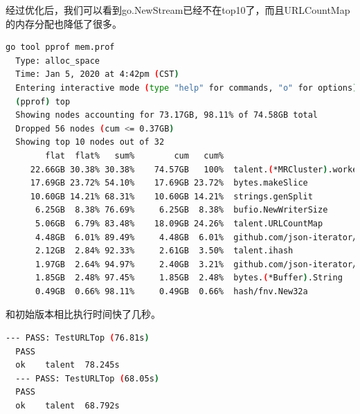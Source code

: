 \documentclass[UTF8]{ctexart}
\begin{document}
经过优化后，我们可以看到go.NewStream已经不在top10了，而且URLCountMap的内存分配也降低了很多。
\begin{lstlisting}[language=bash]
  go tool pprof mem.prof
  Type: alloc_space
  Time: Jan 5, 2020 at 4:42pm (CST)
  Entering interactive mode (type "help" for commands, "o" for options)
  (pprof) top
  Showing nodes accounting for 73.17GB, 98.11% of 74.58GB total
  Dropped 56 nodes (cum <= 0.37GB)
  Showing top 10 nodes out of 32
        flat  flat%   sum%        cum   cum%
     22.66GB 30.38% 30.38%    74.57GB   100%  talent.(*MRCluster).worker
     17.69GB 23.72% 54.10%    17.69GB 23.72%  bytes.makeSlice
     10.60GB 14.21% 68.31%    10.60GB 14.21%  strings.genSplit
      6.25GB  8.38% 76.69%     6.25GB  8.38%  bufio.NewWriterSize
      5.06GB  6.79% 83.48%    18.09GB 24.26%  talent.URLCountMap
      4.48GB  6.01% 89.49%     4.48GB  6.01%  github.com/json-iterator/go.(*Stream).WriteStringWithHTMLEscaped
      2.12GB  2.84% 92.33%     2.61GB  3.50%  talent.ihash
      1.97GB  2.64% 94.97%     2.40GB  3.21%  github.com/json-iterator/go.(*Iterator).ReadString
      1.85GB  2.48% 97.45%     1.85GB  2.48%  bytes.(*Buffer).String
      0.49GB  0.66% 98.11%     0.49GB  0.66%  hash/fnv.New32a
\end{lstlisting}

和初始版本相比执行时间快了几秒。
\begin{lstlisting}[language=bash]
  --- PASS: TestURLTop (76.81s)
  PASS
  ok  	talent	78.245s
  --- PASS: TestURLTop (68.05s)
  PASS
  ok  	talent	68.792s
\end{lstlisting}
\end{document}

